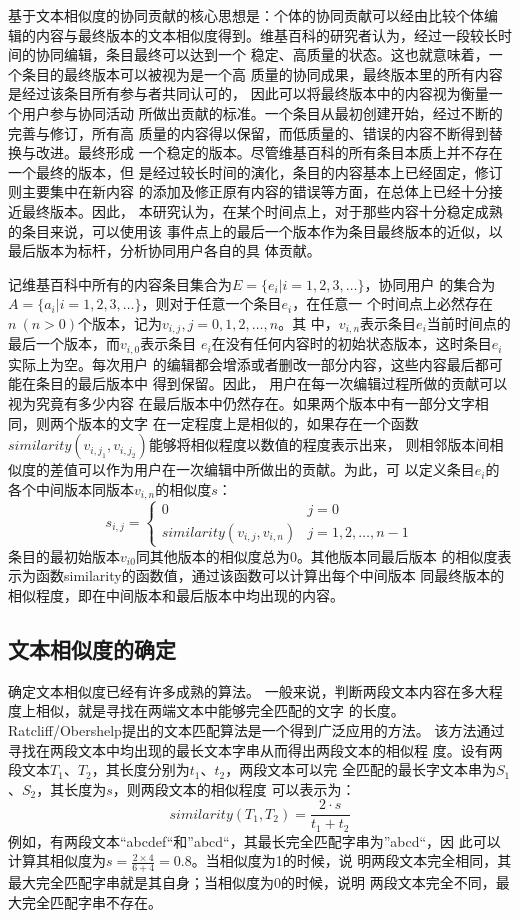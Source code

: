 基于文本相似度的协同贡献的核心思想是：个体的协同贡献可以经由比较个体编
辑的内容与最终版本的文本相似度得到。维基百科的研究者认为，经过一段较长时间的协同编辑，条目最终可以达到一个
稳定、高质量的状态。这也就意味着，一个条目的最终版本可以被视为是一个高
质量的协同成果，最终版本里的所有内容是经过该条目所有参与者共同认可的，
因此可以将最终版本中的内容视为衡量一个用户参与协同活动
所做出贡献的标准。一个条目从最初创建开始，经过不断的完善与修订，所有高
质量的内容得以保留，而低质量的、错误的内容不断得到替换与改进。最终形成
一个稳定的版本。尽管维基百科的所有条目本质上并不存在一个最终的版本，但
是经过较长时间的演化，条目的内容基本上已经固定，修订则主要集中在新内容
的添加及修正原有内容的错误等方面，在总体上已经十分接近最终版本。因此，
本研究认为，在某个时间点上，对于那些内容十分稳定成熟的条目来说，可以使用该
事件点上的最后一个版本作为条目最终版本的近似，以最后版本为标杆，分析协同用户各自的具
体贡献。

记维基百科中所有的内容条目集合为$E=\{e_i|i=1,2,3,\ldots \}$，协同用户
的集合为$A=\{a_i|i=1,2,3,\ldots \}$，则对于任意一个条目$e_i$，在任意一
个时间点上必然存在$n \ (n>0)$个版本，记为$v_{i,j} , j=0,1,2,\ldots,n$。其
中，$v_{i,n}$表示条目$e_i$当前时间点的最后一个版本，而$v_{i,0}$表示条目
$e_i$在没有任何内容时的初始状态版本，这时条目$e_i$实际上为空。每次用户
的编辑都会增添或者删改一部分内容，这些内容最后都可能在条目的最后版本中
得到保留。因此， 用户在每一次编辑过程所做的贡献可以视为究竟有多少内容
在最后版本中仍然存在。如果两个版本中有一部分文字相同，则两个版本的文字
在一定程度上是相似的，如果存在一个函数
$similarity(v_{i,j_1},v_{i,j_2})$能够将相似程度以数值的程度表示出来，
则相邻版本间相似度的差值可以作为用户在一次编辑中所做出的贡献。为此，可
以定义条目$e_i$的各个中间版本同版本$v_{i,n}$的相似度$s$：
\[
s_{i,j}=
\left\{
  \begin{array}{ll}
   0&j=0\\
   similarity(v_{i,j},v_{i,n})&j=1,2,\ldots,n-1 
  \end{array}
  \right.
\]
条目的最初始版本$v_{i0}$同其他版本的相似度总为$0$。其他版本同最后版本
的相似度表示为函数similarity的函数值，通过该函数可以计算出每个中间版本
同最终版本的相似程度，即在中间版本和最后版本中均出现的内容。

\subsection{文本相似度的确定}
\label{sec:similarity}

确定文本相似度已经有许多成熟的算法。
一般来说，判断两段文本内容在多大程度上相似，就是寻找在两端文本中能够完全匹配的文字
的长度。Ratcliff/Obershelp提出的文本匹配算法是一个得到广泛应用的方法。
该方法通过寻找在两段文本中均出现的最长文本字串从而得出两段文本的相似程
度。设有两段文本$T_1$、$T_2$，其长度分别为$t_1$、$t_2$，两段文本可以完
全匹配的最长字文本串为$S_1$、$S_2$，其长度为$s$，则两段文本的相似程度
可以表示为：
\[
similarity(T_1,T_2)=\frac{2 \cdot  s}{t_1+t_2}
\]
例如，有两段文本“abcdef“和”abcd“，其最长完全匹配字串为”abcd“，因
此可以计算其相似度为$s=\frac{2 \times 4}{6+4}=0.8$。当相似度为1的时候，说
明两段文本完全相同，其最大完全匹配字串就是其自身；当相似度为0的时候，说明
两段文本完全不同，最大完全匹配字串不存在。


